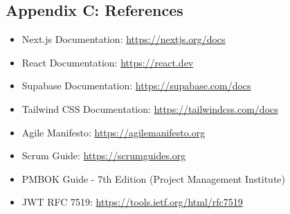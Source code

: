\documentclass[12pt,a4paper]{article}
\begin{document}
\subsection{Appendix C: References}

\begin{itemize}[noitemsep]
    \item Next.js Documentation: \url{https://nextjs.org/docs}
    \item React Documentation: \url{https://react.dev}
    \item Supabase Documentation: \url{https://supabase.com/docs}
    \item Tailwind CSS Documentation: \url{https://tailwindcss.com/docs}
    \item Agile Manifesto: \url{https://agilemanifesto.org}
    \item Scrum Guide: \url{https://scrumguides.org}
    \item PMBOK Guide - 7th Edition (Project Management Institute)
    \item JWT RFC 7519: \url{https://tools.ietf.org/html/rfc7519}
\end{itemize}
\end{document}

